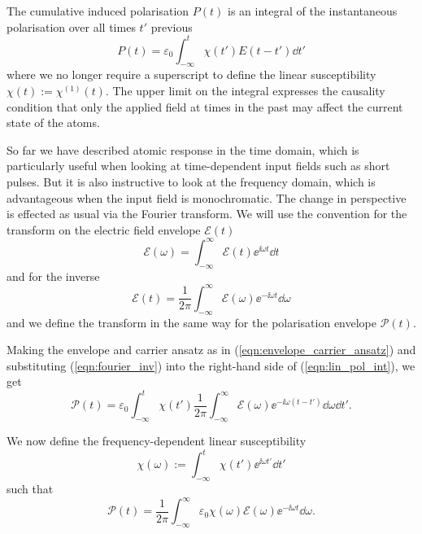     The cumulative induced polarisation $P(t)$ is an integral of the
    instantaneous polarisation over all times $t'$ previous
    \begin{equation}\label{eqn:lin_pol_int}
      P(t) = \varepsilon_0 \int_{-\infty}^t{\chi(t') E(t - t') \dd t'}
    \end{equation}
    where we no longer require a superscript to define the linear susceptibility
    $\chi(t) := \chi^{(1)}(t)$. The upper limit on the integral expresses the
    causality condition that only the applied field at times in the past may
    affect the current state of the atoms.

    So far we have described atomic response in the time domain, which is
    particularly useful when looking at time-dependent input fields such as
    short pulses. But it is also instructive to look at the frequency domain,
    which is advantageous when the input field is monochromatic. The change in
    perspective is effected as usual via the Fourier
    transform.\cite{hecht2015optics} We will use the convention for the
    transform on the electric field envelope
    $\mathcal{E}(t)$
    \begin{equation}\label{eqn:fourier_transform}
      \mathcal{E}(\omega) = \int_{-\infty}^{\infty} \mathcal{E}(t) 
                              \ee^{\ii \omega t}  \dd t
    \end{equation}
    and for the inverse
    \begin{equation}\label{eqn:fourier_inv}
      \mathcal{E}(t) = \frac{1}{2\pi}\int_{-\infty}^{\infty} \mathcal{E}(\omega) 
                          \ee^{-\ii \omega t} \dd \omega
    \end{equation} 
    and we define the transform in the same way for the polarisation envelope
    $\mathcal{P}(t)$.

    Making the envelope and carrier ansatz as in
    (\ref{eqn:envelope_carrier_ansatz}) and substituting (\ref{eqn:fourier_inv})
    into the right-hand side of (\ref{eqn:lin_pol_int}), we get
    \begin{equation}
      \mathcal{P}(t) = \varepsilon_0 \int_{-\infty}^{t} \chi(t') \frac{1}{2 \pi} 
      \int_{-\infty}^{\infty} \mathcal{E}(\omega) \ee^{-\ii \omega (t - t')} 
      \dd \omega \dd t'.
    \end{equation}

    We now define the frequency-dependent linear susceptibility 
    \begin{equation}
       \chi(\omega) := \int_{-\infty}^{t} \chi(t') \ee^{\ii \omega t'} \dd t'
    \end{equation}  
    such that
    \begin{equation}
      \mathcal{P}(t) = \frac{1}{2\pi} \int_{-\infty}^{\infty} \varepsilon_0 
      \chi(\omega) \mathcal{E}(\omega) \ee^{-\ii \omega t} \dd \omega.
    \end{equation}


